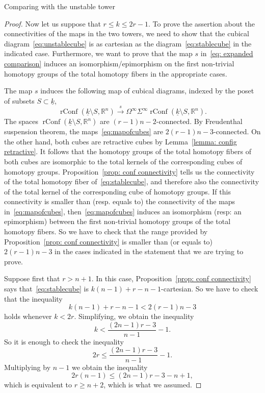 \documentclass[12pt]{amsart}
\newcommand{\R}{{\mathbb R}}
\newcommand{\rConf}{\operatorname{rConf}}
\theoremstyle{plain}
\theoremstyle{definition}
\theoremstyle{remark}
\begin{document}
\begin{section}{Comparing with the unstable tower}
\begin{proof}
Now let us suppose that $r\le k \le 2r-1$. To prove the assertion about the connectivities of the maps in the two towers, we need to show that the cubical diagram~\eqref{eq:unstablecube} is as cartesian as the diagram~\eqref{eq:stablecube} in the indicated case. Furthermore, we want to prove that the map $s$ in~\eqref{eq: expanded comparison} induces an isomorphism/epimorphism on the first non-trivial homotopy groups of the total homotopy fibers in the appropriate cases.

The map $s$ induces the following map of cubical diagrams, indexed by the poset of subsets $S\subset \underline{k}$,
\begin{equation}\label{eq:mapofcubes}
\rConf({\underline{k}\setminus S}, \R^n)\xrightarrow{s} \Omega^\infty\Sigma^\infty \rConf({\underline{k}\setminus S}, \R^n).
\end{equation}
The spaces $\rConf({\underline{k}\setminus S}, \R^n)$ are $(r-1)n-2$-connected. By Freudenthal suspension theorem, the maps~\eqref{eq:mapofcubes} are $2(r-1)n-3$-connected. On the other hand, both cubes are retractive cubes by Lemma~\ref{lemma: config retractive}. It follows that the homotopy groups of the total homotopy fibers of both cubes are isomorphic to the total kernels of the corresponding cubes of homotopy groups. Proposition~\ref{prop: conf connectivity} tells us the connectivity of the total homotopy fiber of~\eqref{eq:stablecube}, and therefore also the connectivity of the total kernel of the corresponding cube of homotopy groups. If this connectivity is smaller than (resp. equals to) the connectivity of the maps in~\eqref{eq:mapofcubes}, then~\eqref{eq:mapofcubes} induces an isomorphism (resp: an epimorphism) between the first non-trivial homotopy groups of the total homotopy fibers. So we have to check that the range provided by Proposition~\ref{prop: conf connectivity} is smaller than (or equals to) $2(r-1)n-3$ in the cases indicated in the statement that we are trying to prove.

Suppose first that $r> n+1$. In this case, Proposition~\ref{prop: conf connectivity} says that~\eqref{eq:stablecube} is $k(n-1)+r-n-1$-cartesian. So we have to check that the inequality
\[
k(n-1)+r-n-1< 2(r-1)n-3
\]
holds whenever $k<2r$. Simplifying, we obtain the inequality
\[
k<\frac{(2n-1)r-3}{n-1} - 1.
\]
So it is enough to check the inequality
\[
2r\le \frac{(2n-1)r-3}{n-1} - 1.
\]
Multiplying by $n-1$ we obtain the inequality
\[
2r(n-1)\le (2n-1)r-3-n+1,
\]
which is equivalent to $r\ge n+2$, which is what we assumed.


\end{proof}
\end{section}
\end{document}
